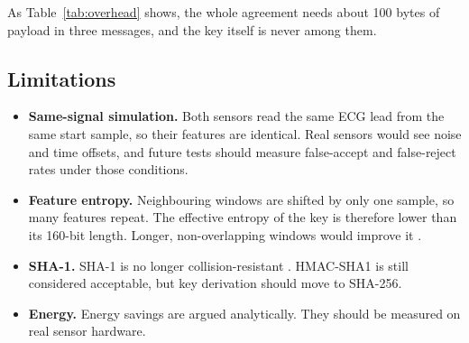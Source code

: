 As Table~\ref{tab:overhead} shows, the whole agreement needs about 100 bytes of payload in three messages, and the key itself is never among them.

\subsection{Limitations}
\begin{itemize}
  \item \textbf{Same-signal simulation.} Both sensors read the same ECG lead from the same start sample, so their features are identical. Real sensors would see noise and time offsets, and future tests should measure false-accept and false-reject rates under those conditions.
  \item \textbf{Feature entropy.} Neighbouring windows are shifted by only one sample, so many features repeat. The effective entropy of the key is therefore lower than its 160-bit length. Longer, non-overlapping windows would improve it \cite{poon2006novel}.
  \item \textbf{SHA-1.} SHA-1 is no longer collision-resistant \cite{stevens2017sha1}. HMAC-SHA1 is still considered acceptable, but key derivation should move to SHA-256.
  \item \textbf{Energy.} Energy savings are argued analytically. They should be measured on real sensor hardware.
\end{itemize}
